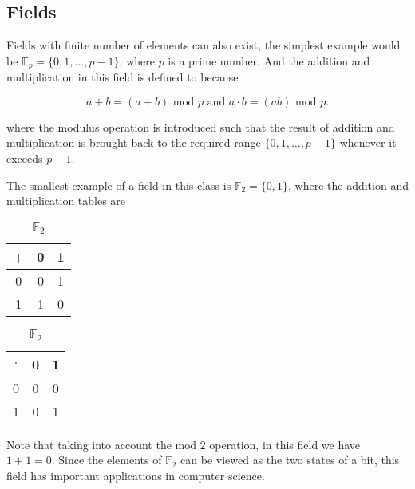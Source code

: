 \documentclass[a4paper,12pt]{report}
\begin{document}
\begin{appendices}
\section{Fields} \label{fields} 

Fields with finite number of elements can also exist, the simplest example would be \(\mathbb{F}_{p} = \{0,1,\ldots ,p-1\} \), where \(p\) is a prime number. And the addition and multiplication in this field is defined to because

\begin{equation}
    a + b = (a+b) \text{ mod } p \text { and } a \cdot b = (ab) \text{ mod } p. 
\end{equation}

where the modulus operation is introduced such that the result of addition and multiplication is brought back to the required range \(\{0,1,\ldots ,p-1\}\) whenever it exceeds \(p-1\).

The smallest example of a field in this class is \(\mathbb{F} _{2}  = \{0,1\} \), where the addition and multiplication tables are


\begin{table}[H]
    \begin{minipage}[t]{0.5\linewidth}
    \centering
    \begin{tabular}{c|c|c}
        \toprule
          +   &  0  &  1 \\
        \midrule
          0   &  0  &  1 \\
          1   &  1  &  0 \\
        \bottomrule
    \end{tabular}
    \caption{ \(\mathbb{F}_{2}  \) }
\label{add}
\end{minipage} 
\begin{minipage}[t]{0.5\linewidth}
    \centering
    \begin{tabular}{c|c|c}
        \toprule
          \(\cdot \)    & 0 & 1  \\
        \midrule
            0 & 0 &  0 \\
            1 & 0 &  1 \\
        \bottomrule
    \end{tabular}
    \caption{ \(\mathbb{F}_{2}  \)  }
\label{mul}
\end{minipage}
\end{table}

Note that taking into account the \(\text{mod } 2 \) operation, in this field we have \(1+1 = 0\). Since the elements of \(\mathbb{F}_{2}  \) can be viewed as the two states of a bit, this field has important applications in computer science. 


\end{appendices}
\end{document}
